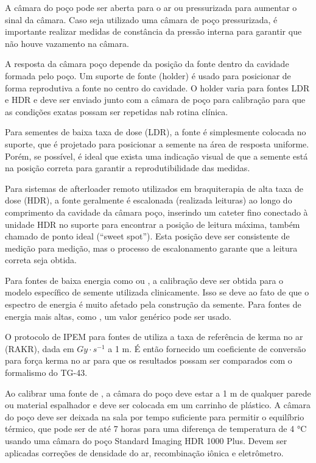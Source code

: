\documentclass[11pt,a4paper]{article}
\begin{document}
	A câmara do poço pode ser aberta para o ar ou pressurizada para aumentar o sinal da câmara. Caso seja utilizado uma câmara de poço pressurizada, é importante realizar medidas de constância da pressão interna para garantir que não houve vazamento na câmara. 
	
	A resposta da câmara poço depende da posição da fonte dentro da cavidade formada pelo poço. Um suporte de fonte (holder) é usado para posicionar de forma reprodutiva a fonte no centro do cavidade. O holder varia para fontes LDR e HDR 
	e deve ser enviado junto com a câmara de poço para calibração para que as condições exatas possam ser repetidas nab rotina clínica.

	
	Para sementes de baixa taxa de dose (LDR), a fonte é simplesmente colocada no suporte, que é projetado para posicionar a semente na área de resposta uniforme. Porém, se possível, é ideal que exista uma indicação visual de que a semente está na posição correta para garantir a  reprodutibilidade das medidas.

	Para sistemas de afterloader remoto utilizados em braquiterapia de alta taxa de dose (HDR), a fonte geralmente é escalonada (realizada leituras) ao longo do comprimento da cavidade da câmara poço, inserindo um cateter fino conectado à unidade HDR no suporte para encontrar a posição de leitura máxima, também chamado de ponto ideal (``sweet spot''). Esta posição deve ser consistente de medição para medição, mas o processo de escalonamento garante que a leitura correta seja obtida.

	

	Para fontes de baixa energia como  ou , a calibração deve ser obtida para o modelo específico de semente utilizada clinicamente. Isso se deve ao fato de que o espectro de energia é muito afetado pela construção da semente. Para fontes de energia mais altas, como , um valor genérico pode ser usado.

	O protocolo de IPEM para fontes de  utiliza a taxa de referência de kerma no ar (RAKR), dada em $Gy \cdot s^{-1}$ a 1 m. É então fornecido um coeficiente de conversão para força  kerma no ar para que os resultados possam ser comparados com o formalismo do TG-43.

	Ao calibrar uma fonte de , a câmara do poço deve estar a 1 m de qualquer parede ou material espalhador e deve ser colocada em um carrinho de plástico. A câmara do poço deve ser deixada na sala por tempo suficiente para permitir o equilíbrio térmico, que pode ser de até 7 horas para uma diferença de temperatura de 4 °C usando uma câmara do poço Standard Imaging HDR 1000 Plus. Devem ser aplicadas correções de densidade do ar, recombinação iônica e eletrômetro. 
\end{document}
